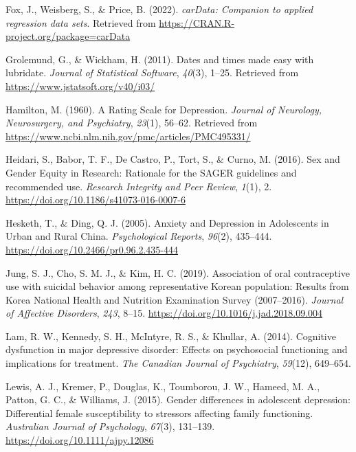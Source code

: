 \documentclass[
  man,floatsintext]{apa6}
\newlength{\cslhangindent}
\newlength{\cslentryspacingunit} %
\newenvironment{CSLReferences}[2] %
 {%
  \setlength{\parindent}{0pt}
  \ifodd #1
  \let\oldpar\par
  \def\par{\hangindent=\cslhangindent\oldpar}
  \fi
  \setlength{\parskip}{#2\cslentryspacingunit}
 }%
 {}
\begin{document}
\begin{CSLReferences}{1}{0}
\leavevmode{}%
Fox, J., Weisberg, S., \& Price, B. (2022). \emph{carData: Companion to applied regression data sets}. Retrieved from \url{https://CRAN.R-project.org/package=carData}

\leavevmode{}%
Grolemund, G., \& Wickham, H. (2011). Dates and times made easy with {lubridate}. \emph{Journal of Statistical Software}, \emph{40}(3), 1--25. Retrieved from \url{https://www.jstatsoft.org/v40/i03/}

\leavevmode{}%
Hamilton, M. (1960). A {Rating} {Scale} for {Depression}. \emph{Journal of Neurology, Neurosurgery, and Psychiatry}, \emph{23}(1), 56--62. Retrieved from \url{https://www.ncbi.nlm.nih.gov/pmc/articles/PMC495331/}

\leavevmode{}%
Heidari, S., Babor, T. F., De Castro, P., Tort, S., \& Curno, M. (2016). Sex and {Gender} {Equity} in {Research}: Rationale for the {SAGER} guidelines and recommended use. \emph{Research Integrity and Peer Review}, \emph{1}(1), 2. \url{https://doi.org/10.1186/s41073-016-0007-6}

\leavevmode{}%
Hesketh, T., \& Ding, Q. J. (2005). Anxiety and {Depression} in {Adolescents} in {Urban} and {Rural} {China}. \emph{Psychological Reports}, \emph{96}(2), 435--444. \url{https://doi.org/10.2466/pr0.96.2.435-444}

\leavevmode{}%
Jung, S. J., Cho, S. M. J., \& Kim, H. C. (2019). Association of oral contraceptive use with suicidal behavior among representative {Korean} population: {Results} from {Korea} {National} {Health} and {Nutrition} {Examination} {Survey} (2007--2016). \emph{Journal of Affective Disorders}, \emph{243}, 8--15. \url{https://doi.org/10.1016/j.jad.2018.09.004}

\leavevmode{}%
Lam, R. W., Kennedy, S. H., McIntyre, R. S., \& Khullar, A. (2014). Cognitive dysfunction in major depressive disorder: Effects on psychosocial functioning and implications for treatment. \emph{The Canadian Journal of Psychiatry}, \emph{59}(12), 649--654.

\leavevmode{}%
Lewis, A. J., Kremer, P., Douglas, K., Toumborou, J. W., Hameed, M. A., Patton, G. C., \& Williams, J. (2015). Gender differences in adolescent depression: {Differential} female susceptibility to stressors affecting family functioning. \emph{Australian Journal of Psychology}, \emph{67}(3), 131--139. \url{https://doi.org/10.1111/ajpy.12086}


\end{CSLReferences}
\end{document}
